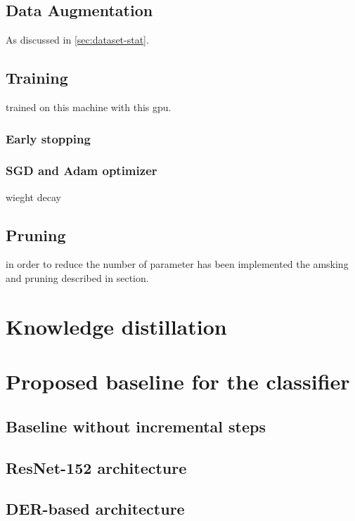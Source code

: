 \subsection{Data Augmentation}
As discussed in \autoref{sec:dataset-stat}.
\subsection{Training}
trained on this machine with this gpu.
\subsubsection{Early stopping}
\subsubsection{SGD and Adam optimizer}
wieght decay

\subsection{Pruning}
in order to reduce the number of parameter has been implemented the amsking and pruning described in section.
\label{sec:method-pruning}
\section{Knowledge distillation}

\label{sec:method-kd}
\section{Proposed baseline for the classifier}
\label{sec:method-baseline}
\subsection{Baseline without incremental steps}
\subsection{ResNet-152 architecture}
\subsection{DER-based architecture}